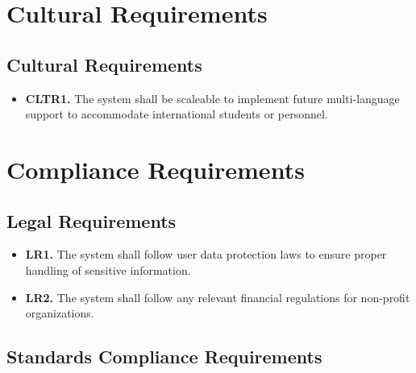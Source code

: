 \documentclass[12pt]{article}
\begin{document}
\section{Cultural Requirements}
\subsection{Cultural Requirements}

\label{CLTR}

\begin{itemize}
    \item \textbf{CLTR1.} The system shall be scaleable to implement future multi-language support to accommodate international students or personnel.
\end{itemize}

\section{Compliance Requirements}
\subsection{Legal Requirements}

\label{LR}

\begin{itemize}
    \item \textbf{LR1.} The system shall follow user data protection laws to ensure proper handling of sensitive information.
    \item \textbf{LR2.} The system shall follow any relevant financial regulations for non-profit organizations.
\end{itemize}
\subsection{Standards Compliance Requirements}
\end{document}
